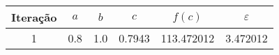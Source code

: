 \begin{tabular}{cccccc}
\toprule
Iteração & $a$ & $b$ &    $c$ &     $f(c)$ & $\varepsilon$ \\
\midrule
       1 & 0.8 & 1.0 & 0.7943 & 113.472012 &      3.472012 \\
\bottomrule
\end{tabular}
